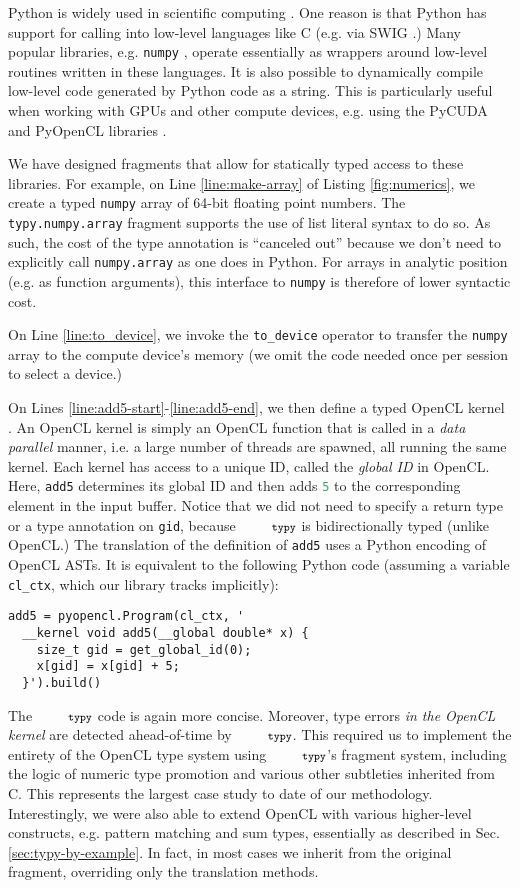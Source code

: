 \documentclass[10pt]{sigplanconf}
\newcommand{\typy}{\texttt{\footnotesize typy}}
\newcommand{\lip}[1]{\lstinline[language=Python,basicstyle=\ttfamily\footnotesize,morekeywords={with},deletendkeywords={tuple,buffer,map}]{#1}}
\newcommand{\li}[1]{\lip{#1}}
\begin{document}
Python is widely used in scientific computing \cite{oliphant2007python}. One reason is that Python has support for calling into low-level languages like C (e.g. via SWIG \cite{beazley2003automated}.) Many popular libraries, e.g. \li{numpy} \cite{van2011numpy}, operate essentially as wrappers around low-level routines written in these languages. It is also possible to dynamically compile low-level code generated by Python code as a string. This is particularly useful when working with GPUs and other compute devices, e.g. using the PyCUDA and PyOpenCL libraries \cite{klockner2011pycuda}.

We have designed fragments that allow for statically typed access to these libraries. For example, on Line \ref{line:make-array} of Listing \ref{fig:numerics}, we create a typed \li{numpy} array of 64-bit floating point numbers. The \li{typy.numpy.array} fragment supports the use of list literal syntax to do so. As such, the cost of the type annotation is ``canceled out'' because we don't need to explicitly call \li{numpy.array} as one does in Python. For arrays in analytic position (e.g. as function arguments), this interface to \li{numpy} is therefore of lower syntactic cost.

On Line \ref{line:to_device}, we invoke the \li{to_device} operator to transfer the \li{numpy} array to the compute device's memory (we omit the code needed once per session to select a device.)

On Lines \ref{line:add5-start}-\ref{line:add5-end}, we then define a typed OpenCL kernel \cite{opencl11}. An OpenCL kernel is simply an OpenCL function that is called in a \emph{data parallel} manner, i.e. a large number of threads are spawned, all running the same kernel. Each kernel has access to a unique ID, called the \emph{global ID} in OpenCL. Here, \li{add5} determines its global ID and then adds \li{5} to the corresponding element in the input buffer. Notice that we did not need to specify a return type or a type annotation on \li{gid}, because $\typy$ is bidirectionally typed (unlike OpenCL.) The translation of the definition of \li{add5} uses a Python encoding of OpenCL ASTs. It is equivalent to the following Python code (assuming a variable \li{cl_ctx}, which our library tracks implicitly):
\begin{lstlisting}[numbers=none]
add5 = pyopencl.Program(cl_ctx, '
  __kernel void add5(__global double* x) {
    size_t gid = get_global_id(0);
    x[gid] = x[gid] + 5;
  }').build()
\end{lstlisting}
The $\typy$ code is again more concise. Moreover, type errors \emph{in the OpenCL kernel} are detected ahead-of-time by $\typy$. This required us to implement the entirety of the OpenCL type system using $\typy$'s fragment system, including the logic of numeric type promotion and various other subtleties inherited from C. This represents the largest case study to date of our methodology. Interestingly, we were also able to extend OpenCL with various higher-level constructs, e.g. pattern matching and sum types, essentially as described in Sec. \ref{sec:typy-by-example}. In fact, in most cases we inherit from the original fragment, overriding only the translation methods. 
\end{document}
